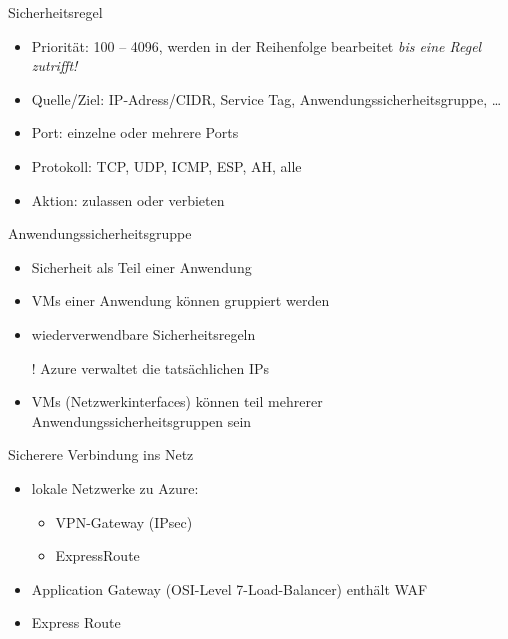 \begin{flashcard}[]{Sicherheitsregel}
  \begin{itemize}
    \item Priorität: 100 -- 4096, werden in der Reihenfolge bearbeitet \emph{bis eine Regel zutrifft!}
    \item Quelle/Ziel: IP-Adress/CIDR, Service Tag, Anwendungssicherheitsgruppe, \ldots
    \item Port: einzelne oder mehrere Ports
    \item Protokoll: TCP, UDP, ICMP, ESP, AH, alle
    \item Aktion: zulassen oder verbieten
  \end{itemize}
\end{flashcard}

\begin{flashcard}[]{Anwendungssicherheitsgruppe}
  \begin{itemize}
    \item Sicherheit als Teil einer Anwendung
    \item VMs einer Anwendung können gruppiert werden
    \item wiederverwendbare Sicherheitsregeln
    \item[!] Azure verwaltet die tatsächlichen IPs
    \item VMs (Netzwerkinterfaces) können teil mehrerer Anwendungssicherheitsgruppen sein
  \end{itemize}
\end{flashcard}

\begin{flashcard}[]{Sicherere Verbindung ins Netz}
  \begin{itemize}
    \item lokale Netzwerke zu Azure:
      \begin{itemize}
        \item VPN-Gateway (IPsec)
        \item ExpressRoute
      \end{itemize}
    \item Application Gateway (OSI-Level 7-Load-Balancer) enthält WAF
    \item Express Route 
  \end{itemize}
\end{flashcard}

